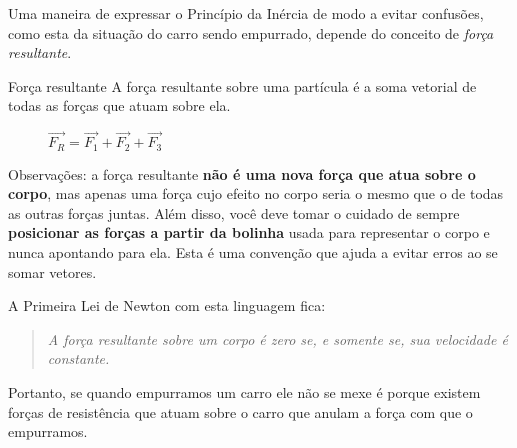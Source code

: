Uma maneira de expressar o Princípio da Inércia de modo a evitar confusões, como esta da situação do carro sendo empurrado, depende do conceito de \textit{força resultante}.
\begin{observationtitle}{Força resultante}
A força resultante sobre uma partícula é a soma vetorial de todas as forças que atuam sobre ela.
\begin{figure}[H]\centering{}\caption{$\vec{F_R} = \vec{F_1} + \vec{F_2} + \vec{F_3}$}
\end{figure}
\end{observationtitle}

Observações: a força resultante \textbf{não é uma nova força que atua sobre o corpo}, mas apenas uma força cujo efeito no corpo seria o mesmo que o de todas as outras forças juntas. Além disso, você deve tomar o cuidado de sempre \textbf{posicionar as forças a partir da bolinha} usada para representar o corpo e nunca apontando para ela. Esta é uma convenção que ajuda a evitar erros ao se somar vetores.

A Primeira Lei de Newton com esta linguagem fica:
\begin{quote}
\textit{A força resultante sobre um corpo é zero se, e somente se, sua velocidade é constante.}
\end{quote}

Portanto, se quando empurramos um carro ele não se mexe é porque existem forças de resistência que atuam sobre o carro que anulam a força com que o empurramos.

